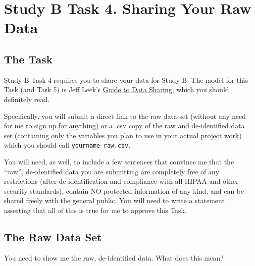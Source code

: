 \documentclass[]{book}
\begin{document}
\hypertarget{task4b}{%
\chapter{Study B Task 4. Sharing Your Raw Data}\label{task4b}}

\hypertarget{the-task-3}{%
\section{The Task}\label{the-task-3}}

Study B Task 4 requires you to share your data for Study B. The model for this Task (and Task 5) is Jeff Leek's \href{https://github.com/jtleek/datasharing}{Guide to Data Sharing}, which you should definitely read.

Specifically, you will submit a direct link to the raw data set (without any need for me to sign up for anything) or a .csv copy of the raw and de-identified data set (containing only the variables you plan to use in your actual project work) which you should call \texttt{yourname-raw.csv}.

You will need, as well, to include a few sentences that convince me that the ``raw'', de-identified data you are submitting are completely free of any restrictions (after de-identification and compliance with all HIPAA and other security standards), contain NO protected information of any kind, and can be shared freely with the general public. You will need to write a statement asserting that all of this is true for me to approve this Task.

\hypertarget{the-raw-data-set}{%
\section{The Raw Data Set}\label{the-raw-data-set}}

You need to show me the raw, de-identified data. What does this mean?
\end{document}
